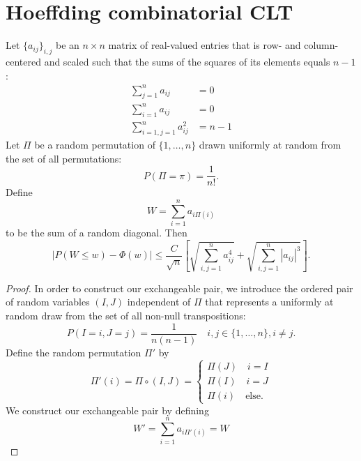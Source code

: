 \section{Hoeffding combinatorial CLT}
\begin{theorem}
  Let $\{a_{ij}\}_{i,j}$ be an $n \times n$ matrix of real-valued entries that is row- and
  column-centered and scaled such that the sums of the squares of its elements equals $n-1$:
  \begin{align}
    \sum_{j=1}^n a_{ij} &= 0 \\
    \sum_{i=1}^n a_{ij} &= 0 \\
    \sum_{i=1, j=1}^n a_{ij}^2 &= n-1
  \end{align}
  Let $\Pi$ be a random permutation of $\{1, \ldots, n\}$ drawn uniformly at random from the set of
  all permutations:
  \begin{equation}
    P(\Pi = \pi) = \frac{1}{n!}.
  \end{equation}
  Define
  \begin{equation}
    W = \sum_{i=1}^n a_{i\Pi(i)}
  \end{equation}
  to be the sum of a random diagonal.  Then
  \begin{equation}
    |P(W \leq w) - \Phi(w)| \leq 
    \frac{C}{\sqrt{n}} \left [
      \sqrt{\sum_{i, j = 1}^n a_{ij}^4} + 
      \sqrt{\sum_{i, j = 1}^n |a_{ij}|^3} 
    \right ].
  \end{equation}
  \begin{proof}
    In order to construct our exchangeable pair, we introduce the ordered pair of random variables
    $(I, J)$ independent of $\Pi$ that represents a uniformly at random draw from the set of all
    non-null transpositions:
    \begin{equation}
      P(I = i, J = j) = \frac{1}{n(n-1)} \quad i, j \in \{1, \ldots, n\}, i \neq j.
    \end{equation}
    Define the random permutation $\Pi'$ by
    \begin{equation}
      \Pi'(i) = \Pi \circ (I, J) = 
      \begin{cases}
        \Pi(J) \quad i = I \\
        \Pi(I) \quad i = J \\
        \Pi(i) \quad \text{else}.
      \end{cases}
    \end{equation}
    We construct our exchangeable pair by defining
    \begin{equation}
      W' = \sum_{i=1}^n a_{i\Pi'(i)} = W 

\end{equation}
\end{proof}
\end{theorem}

